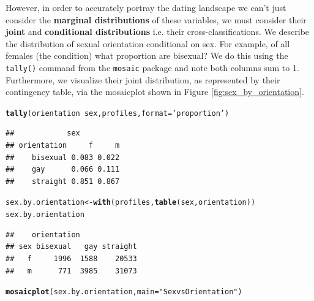 \documentclass{article}\usepackage[]{graphicx}\usepackage[]{color}
\makeatletter
\newcommand{\hlstr}[1]{\textcolor[rgb]{0.192,0.494,0.8}{#1}}%
\newcommand{\hlopt}[1]{\textcolor[rgb]{0,0,0}{#1}}%
\newcommand{\hlstd}[1]{\textcolor[rgb]{0.345,0.345,0.345}{#1}}%
\newcommand{\hlkwb}[1]{\textcolor[rgb]{0.69,0.353,0.396}{#1}}%
\newcommand{\hlkwc}[1]{\textcolor[rgb]{0.333,0.667,0.333}{#1}}%
\newcommand{\hlkwd}[1]{\textcolor[rgb]{0.737,0.353,0.396}{\textbf{#1}}}%
\newenvironment{kframe}{%
 \def\at@end@of@kframe{}%
 \ifinner\ifhmode%
  \def\at@end@of@kframe{\end{minipage}}%
  \begin{minipage}{\columnwidth}%
 \fi\fi%
 \def\FrameCommand##1{\hskip\@totalleftmargin \hskip-\fboxsep
 \colorbox{shadecolor}{##1}\hskip-\fboxsep
     \hskip-\linewidth \hskip-\@totalleftmargin \hskip\columnwidth}%
 \MakeFramed {\advance\hsize-\width
   \@totalleftmargin\z@ \linewidth\hsize
   \@setminipage}}%
 {\par\unskip\endMakeFramed%
 \at@end@of@kframe}
\newenvironment{knitrout}{}{} %
\makeatother
\begin{document}
However, in order to accurately portray the dating landscape we can't just consider the \textbf{marginal distributions} of these variables, we must consider their \textbf{joint} and \textbf{conditional distributions} i.e. their cross-classifications.  We describe the distribution of sexual orientation conditional on sex.  For example, of all females (the condition) what proportion are bisexual?  We do this using the \verb#tally()# command from the \verb#mosaic# package and note both columns sum to 1.  Furthermore, we visualize their joint distribution, as represented by their contingency table, via the mosaicplot shown in Figure \ref{fig:sex_by_orientation}.

\begin{knitrout}
\color{fgcolor}\begin{kframe}
\begin{alltt}
\hlkwd{tally}\hlstd{(orientation} \hlopt{~} \hlstd{sex, profiles,} \hlkwc{format}\hlstd{=}\hlstr{'proportion'}\hlstd{)}
\end{alltt}
\begin{verbatim}
##            sex
## orientation     f     m
##    bisexual 0.083 0.022
##    gay      0.066 0.111
##    straight 0.851 0.867
\end{verbatim}
\begin{alltt}
\hlstd{sex.by.orientation} \hlkwb{<-} \hlkwd{with}\hlstd{(profiles,} \hlkwd{table}\hlstd{(sex, orientation))}
\hlstd{sex.by.orientation}
\end{alltt}
\begin{verbatim}
##    orientation
## sex bisexual   gay straight
##   f     1996  1588    20533
##   m      771  3985    31073
\end{verbatim}
\begin{alltt}
\hlkwd{mosaicplot}\hlstd{(sex.by.orientation,} \hlkwc{main}\hlstd{=}\hlstr{"Sex vs Orientation"}\hlstd{)}
\end{alltt}
\end{kframe}\begin{figure}


\end{figure}
\end{knitrout}
\end{document}
